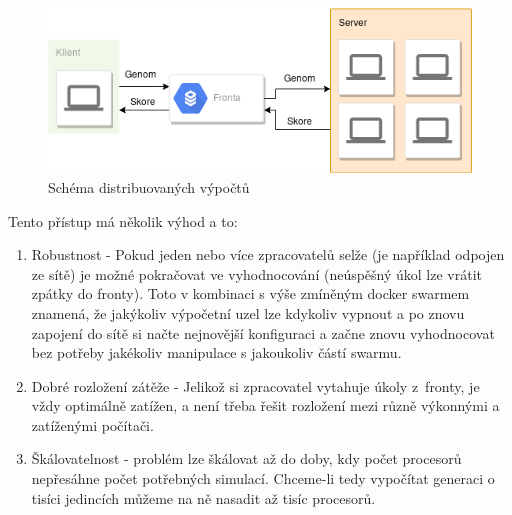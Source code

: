 \begin{figure}[H]
	\centering
	\includegraphics[scale=0.5]{distributed}
	\caption[Schéma distribuovaných výpočtů]{Schéma distribuovaných výpočtů}
	\label{fig:distributed}
\end{figure}

Tento přístup má několik výhod a to:

\begin{enumerate}
	\item Robustnost - Pokud jeden nebo více zpracovatelů selže (je například odpojen ze sítě) je možné pokračovat ve vyhodnocování (neúspěšný úkol lze vrátit zpátky do fronty). Toto v kombinaci s výše zmíněným docker swarmem znamená, že jakýkoliv výpočetní uzel lze kdykoliv vypnout a po znovu zapojení do sítě si načte nejnovější konfiguraci a začne znovu vyhodnocovat bez potřeby jakékoliv manipulace s jakoukoliv částí swarmu.
	\item Dobré rozložení zátěže - Jelikož si zpracovatel vytahuje úkoly z~fronty, je vždy optimálně zatížen, a není třeba řešit rozložení mezi různě výkonnými a zatíženými počítači.
	\item Škálovatelnost - problém lze škálovat až do doby, kdy počet procesorů nepřesáhne počet potřebných simulací. Chceme-li tedy vypočítat generaci o tisíci jedincích můžeme na ně nasadit až tisíc procesorů.
\end{enumerate}

